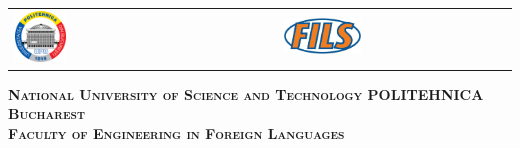 



\begin{titlepage}
	\centering
	\begin{tabular}{p{5cm}p{5.6cm}}
		\includegraphics[width=0.2\textwidth]{img/upb.png} &
		\includegraphics[width=0.35\textwidth]{img/fils.png}
	\end{tabular}
	\vspace{1cm}

	{\scshape\Large \textbf{National University of Science and Technology POLITEHNICA Bucharest} \\}
	{\scshape\Large \textbf{Faculty of Engineering in Foreign Languages} \\}
	
\end{titlepage}

